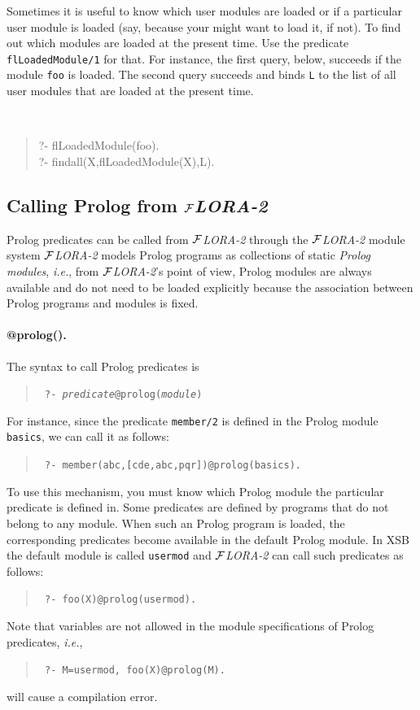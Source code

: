 \documentclass[11pt]{article}
\newcommand{\FLORA}{{\mbox{${\cal F}${\small\it LORA}\rm\emph{-2}}}\xspace}
\begin{document}
Sometimes it is useful to know which user modules are loaded or if a
particular user module is loaded (say, because your might want to load it,
if not).  To find out which modules are loaded at the present time. Use the
predicate {\tt flLoadedModule/1} for that. For instance, the first query,
below, succeeds if the module {\tt foo} is loaded. The second query
succeeds and binds {\tt L} to the list of all user modules that are loaded
at the present time.
{\tt
\begin{quote}
  ?- flLoadedModule(foo).\\
  ?- findall(X,flLoadedModule(X),L).
\end{quote}
}


\subsection{Calling Prolog from \FLORA}\label{sec-prolog-modules}

Prolog predicates can be called from \FLORA through the \FLORA module system
\FLORA models Prolog programs as collections of static {\em Prolog modules},
{\it i.e.}, from \FLORA's point of view, Prolog modules are always available
and do not need to be loaded explicitly because the association between Prolog
programs and modules is fixed.

\paragraph{@prolog().}
The syntax to call Prolog predicates is
\begin{quote}
  \tt
  ?- {\it predicate}@prolog({\it module})  
\end{quote}
For instance, since the predicate {\tt member/2} is defined in the Prolog
module {\tt basics}, we can call it as follows:
\begin{quote}
 \tt
 ?- member(abc,[cde,abc,pqr])@prolog(basics).
\end{quote}
To use this mechanism, you must know which Prolog module the particular
predicate is defined in. Some predicates are defined by programs that do
not belong to any module. When such an Prolog program is loaded, the
corresponding predicates become available in the default Prolog module.  In
XSB the default module is called {\tt usermod} and \FLORA can call such
predicates as follows:
\begin{quote}
 \tt
 ?- foo(X)@prolog(usermod).
\end{quote}
Note that variables are not allowed in the module specifications of Prolog
predicates, {\it i.e.},
\begin{quote}
 \tt
 ?- M=usermod, foo(X)@prolog(M).
\end{quote}
will cause a compilation error.
\end{document}
